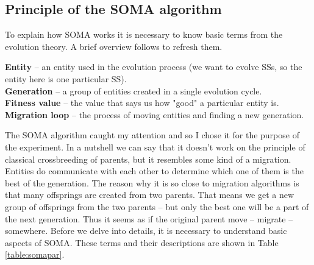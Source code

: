 \documentclass[review]{elsarticle}
\begin{document}
\subsection{Principle of the SOMA algorithm}
To explain how SOMA works it is necessary to know basic terms from the evolution theory. A brief overview follows to refresh them. 
\vspace{10pt}

\noindent
\textbf{Entity} -- an entity used in the evolution process (we want to evolve SSs, so the entity here is one particular SS). \\
\textbf{Generation} -- a group of entities created in a single evolution cycle. \\
\textbf{Fitness value} -- the value that says us how "good" a particular entity is. \\
\textbf{Migration loop} -- the process of moving entities and finding a new generation. \\
\vspace{10pt}

The SOMA algorithm caught my attention and so I chose it for the purpose of the experiment. In a nutshell we can say that it doesn't work on the principle of classical crossbreeding of parents, but it resembles some kind of a migration. Entities do communicate with each other to determine which one of them is the best of the generation. 
The reason why it is so close to migration algorithms is that many offsprings are created from two parents. That means we get a new group of offsprings from the two parents -- but only the best one will be a part of the next generation. Thus it seems as if the original parent move -- migrate -- somewhere. Before we delve into details, it is necessary to understand basic aspects of SOMA. These terms and their descriptions are shown in Table \ref{table:somapar}.
\end{document}
